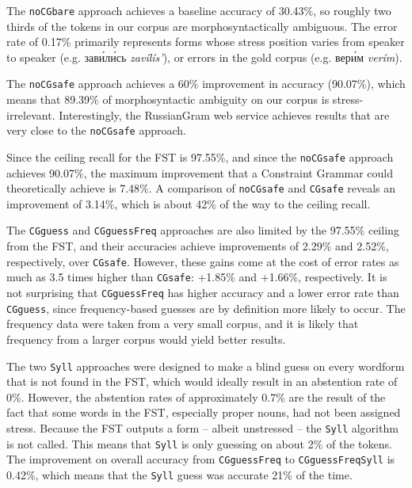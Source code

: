 \documentclass[11pt]{article}
\newcommand{\rus}[1]{\foreignlanguage{russian}{#1}}
\newcommand{\rr}[1]{\marginpar{\scriptsize R: #1}} %
\begin{document}
The {\small {\tt noCGbare}} approach achieves a baseline accuracy of
30.43\%, so roughly two thirds of the tokens in our corpus are
morphosyntactically ambiguous. The error rate of 0.17\% primarily represents 
forms whose stress position varies from speaker to speaker (e.g.
\rus{зав\'{и}л\'{и}сь} \emph{zav\'{i}l\'{i}s'}), or errors in the gold corpus 
(e.g. \rus{вер\'{и}м} \emph{ver\'{i}m}).

The {\small {\tt noCGsafe}} approach
achieves a 60\% improvement in accuracy (90.07\%), which means that 89.39\% of 
morphosyntactic ambiguity on our corpus is stress-irrelevant. Interestingly, the 
RussianGram web service achieves results that are very close 
to the {\small {\tt noCGsafe}} approach.

Since the ceiling recall for the FST is 97.55\%, and since the 
{\small {\tt noCGsafe}} approach achieves 90.07\%, the maximum improvement 
that a Constraint Grammar could theoretically achieve is 7.48\%. A comparison
of {\small {\tt noCGsafe}} and {\small {\tt CGsafe}} reveals an improvement
of 3.14\%, which is about 42\% of the way to the ceiling recall.

The {\small {\tt CGguess}} and {\small {\tt CGguessFreq}} approaches are also 
limited by the 97.55\% ceiling from the FST, and their accuracies achieve
improvements of 2.29\% and 2.52\%, respectively, over {\small {\tt CGsafe}}.
However, these gains come at the cost of error rates as much as 3.5 times 
higher than {\small {\tt CGsafe}}: +1.85\% and +1.66\%, respectively. It is
not surprising that {\small {\tt CGguessFreq}} has higher accuracy and a lower
error rate than {\small {\tt CGguess}}, since frequency-based guesses are by
definition more likely to occur. The frequency data were taken from a very 
small corpus, and it is likely that frequency from a larger corpus would yield 
better results.

The two {\small {\tt Syll}} approaches were designed to make a blind guess on 
every wordform that is not found in the FST, which would ideally result in an
abstention rate of 0\%. However, the abstention rates of approximately 0.7\%
are the result of the fact that some words in the FST, especially proper nouns, 
had not been assigned stress. Because the FST outputs a form -- albeit unstressed 
-- the {\small {\tt Syll}} algorithm is not called. This means that 
{\small {\tt Syll}} is only guessing on about 2\% of the tokens. The improvement
on overall accuracy from {\small {\tt CGguessFreq}} to 
{\small {\tt CGguessFreqSyll}} is 0.42\%, which means that the 
{\small {\tt Syll}} guess was accurate 21\% of the time.
\end{document}
